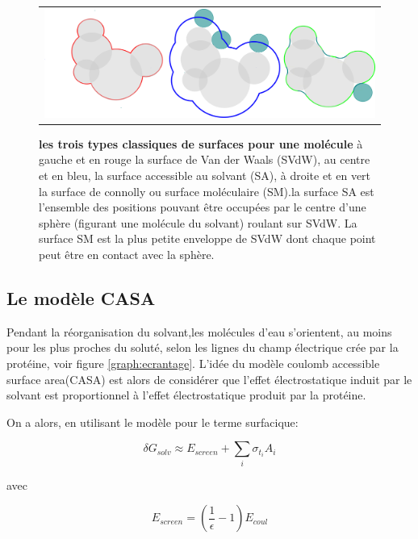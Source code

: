    \begin{figure}[!htbp]
     \centering
     \begin{tabular}{c}
       \includegraphics[width=12cm]{figure/surface.png} &
     \end{tabular}
     
     \caption{\textbf{les trois types classiques de surfaces pour une molécule} à gauche et en rouge la surface de Van der Waals (SVdW), au centre et en bleu, la surface accessible au solvant (SA), à droite et en vert  la surface de connolly ou surface moléculaire (SM).la surface SA est l'ensemble des positions pouvant être occupées par le centre d'une sphère (figurant une molécule du solvant) roulant sur SVdW. La surface SM est la plus petite enveloppe de SVdW dont chaque point peut être en contact avec la sphère. } 
\label{graph:surface}
   \end{figure}
   

\subsection{Le modèle CASA}

Pendant la réorganisation du solvant,les molécules d'eau s'orientent, au moins pour les plus proches du soluté, selon les lignes du champ électrique crée par la protéine, voir figure \ref{graph:ecrantage}. L'idée du modèle \og coulomb accessible surface area\fg (CASA) est alors de considérer que l'effet électrostatique induit par le solvant est proportionnel à l'effet électrostatique produit par la protéine. 

On a  alors, en utilisant le modèle  pour le terme surfacique:

\begin{equation}
\delta G_{solv} \approx E_{screen} + \sum_i \sigma_{t_i} A_i
\end{equation}

avec 

\begin{equation}
E_{screen} =  (\frac{1}{\epsilon} -1 )E_{coul}
\end{equation}

